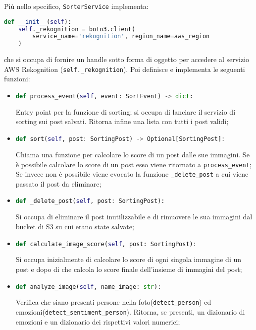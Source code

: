 Più nello specifico, \verb+SorterService+ implementa:
\begin{lstlisting}[language=Python]
def __init__(self):
    self._rekognition = boto3.client(
        service_name='rekognition', region_name=aws_region
    )
\end{lstlisting} 
che si occupa di fornire un handle sotto forma di oggetto per accedere al servizio AWS Rekognition
(\verb+self._rekognition+). 
Poi definisce e implementa le seguenti funzioni:
\begin{itemize}
	\item 
	\begin{lstlisting}[language=Python, numbers=none]
def process_event(self, event: SortEvent) -> dict:
	\end{lstlisting}
Entry point per la funzione di sorting; si occupa di lanciare il servizio di sorting sui post salvati. Ritorna infine una lista con tutti i post validi;
	\item 
	\begin{lstlisting}[language=Python, numbers=none]
def sort(self, post: SortingPost) -> Optional[SortingPost]:
	\end{lstlisting}
Chiama una funzione per calcolare lo score di un post dalle sue immagini. Se è possibile calcolare lo score di un post esso viene ritornato a \verb+process_event+; Se invece non è possibile viene evocato la funzione \verb+_delete_post+ a cui viene passato il post da eliminare;
	\item 
	\begin{lstlisting}[language=Python, numbers=none]
def _delete_post(self, post: SortingPost):
	\end{lstlisting}		
Si occupa di eliminare il post inutilizzabile e di rimuovere le sua immagini dal bucket di S3 su cui erano state salvate;
	\item 
	\begin{lstlisting}[language=Python, numbers=none]
def calculate_image_score(self, post: SortingPost):
	\end{lstlisting}	
Si occupa inizialmente di calcolare lo score di ogni singola immagine di un post e dopo di che calcola lo score finale dell'insieme di immagini del post;
	\item
	\begin{lstlisting}[language=Python, numbers=none]
def analyze_image(self, name_image: str):
	\end{lstlisting}	
Verifica che siano presenti persone nella foto(\verb+detect_person+) ed emozioni(\verb+detect_sentiment_person+). Ritorna, se presenti, un dizionario di emozioni e un dizionario dei rispettivi valori numerici;

\end{itemize}
